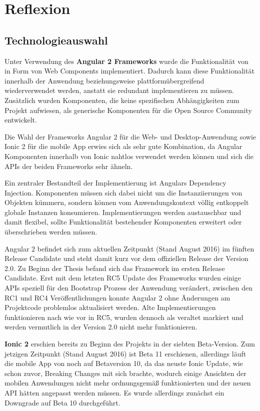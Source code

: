 
\chapter{Reflexion}

\label{chap:reflexion}

\section{Technologieauswahl}

Unter Verwendung des \textbf{Angular 2 Frameworks} wurde die Funktionalität von \projectname{} in Form von
Web Components implementiert.
Dadurch kann diese Funktionalität innerhalb der Anwendung beziehungsweise plattformübergreifend wiederverwendet werden, anstatt sie redundant implementieren zu müssen.
Zusätzlich wurden Komponenten, die keine spezifischen Abhängigkeiten zum Projekt aufwiesen, als
generische Komponenten für die Open Source Community entwickelt.

Die Wahl der Frameworks Angular 2 für die Web- und Desktop-Anwendung sowie Ionic 2 für
die mobile App erwies sich als sehr gute Kombination,
da Angular Komponenten innerhalb von Ionic nahtlos verwendet werden können
und sich die APIs der beiden Frameworks sehr ähneln.

Ein zentraler Bestandteil der Implementierung ist Angulars Dependency Injection.
Komponenten müssen sich dabei nicht um die Instanziierungen von Objekten kümmern,
sondern können vom Anwendungskontext völlig entkoppelt globale Instanzen konsumieren.
Implementierungen werden austauschbar und damit flexibel,
sollte Funktionalität bestehender Komponenten erweitert oder überschrieben werden müssen.

Angular 2 befindet sich zum aktuellen Zeitpunkt (Stand August 2016) im fünften Release Candidate und steht damit kurz
vor dem offiziellen Release der Version 2.0. Zu Beginn der Thesis befand sich das Framework im ersten Release Candidate.
Erst mit dem letzten RC5 Update des Frameworks wurden einige APIs speziell für den Bootstrap Prozess der Anwendung verändert,
zwischen den RC1 und RC4 Veröffentlichungen konnte Angular 2 ohne Änderungen am Projektcode problemlos
aktualisiert werden. Alte Implementierungen funktionieren nach wie vor in RC5,
wurden dennoch als veraltet markiert und werden vermutlich in der Version 2.0 nicht mehr
funktionieren.


\textbf{Ionic 2} erschien bereits zu Beginn des Projekts in der siebten Beta-Version.
Zum jetzigen Zeitpunkt (Stand August 2016) ist Beta 11 erschienen, allerdings läuft die mobile App von
\projectname{} noch auf Betaversion 10, da das neuste Ionic Update,
wie schon zuvor, Breaking Changes mit sich brachte, wodurch einige Ansichten der
mobilen Anwendungen nicht mehr ordnungsgemäß funktionierten und der neuen API hätten angepasst werden müssen.
Es wurde allerdings zunächst ein Downgrade auf Beta 10 durchgeführt.

